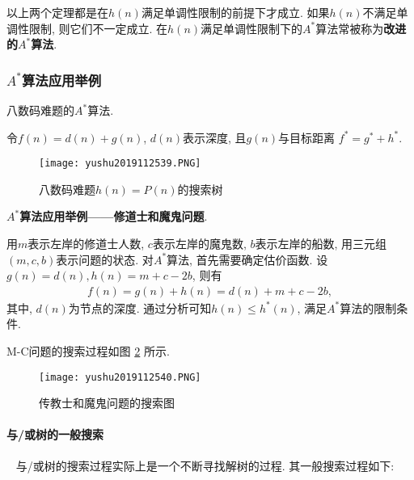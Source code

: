 \begin{remark}
    以上两个定理都是在$h(n)$满足单调性限制的前提下才成立. 如果$h(n)$不满足单调性限制, 则它们不一定成立.
在$h(n)$满足单调性限制下的$A^*$算法常被称为\textbf{改进的$A^*$算法}.
\end{remark}
\subsubsection{$A^*$算法应用举例}
\begin{example}
    八数码难题的$A^*$算法.
\end{example}
\begin{result}
    令$f(n)=d(n)+g(n)$, $d(n)$表示深度, 且$g(n)$与目标距离 $f^*=g^*+h^*$.
\begin{figure}[H]
    \centering
    \texttt{[image: yushu2019112539.PNG]}
    \caption{八数码难题$h(n)=P(n)$的搜索树}
    \label{AI32fig39}
\end{figure}
\end{result}

\begin{example}
    \textbf{$A^*$算法应用举例——修道士和魔鬼问题}.
\end{example}
\begin{result}
用$m$表示左岸的修道士人数, $c$表示左岸的魔鬼数, $b$表示左岸的船数, 用三元组$(m, c, b)$表示问题的状态.
对$A^*$算法, 首先需要确定估价函数. 设$g(n)=d(n), h(n)=m+c-2b$, 则有
\begin{align}
    f(n)=g(n)+h(n)=d(n)+m+c-2b,
\end{align}
其中, $d(n)$为节点的深度. 通过分析可知$h(n)\leq h^*(n)$, 满足$A^*$算法的限制条件.
\end{result}

M-C问题的搜索过程如图 \ref{AI32fig40} 所示.
\begin{figure}[H]
    \centering
    \texttt{[image: yushu2019112540.PNG]}
    \caption{传教士和魔鬼问题的搜索图}
    \label{AI32fig40}
\end{figure}
\paragraph{与/或树的一般搜索}~{}
与/或树的搜索过程实际上是一个不断寻找解树的过程. 其一般搜索过程如下:

